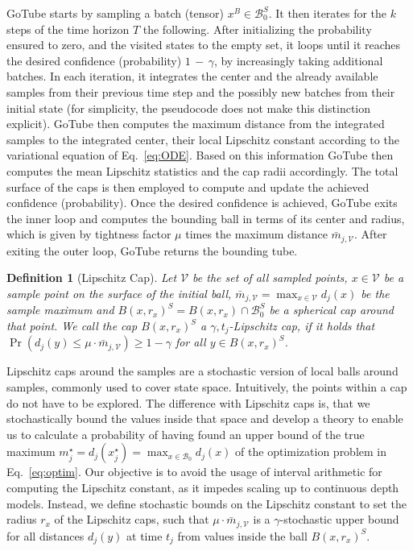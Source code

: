 \documentclass[letterpaper]{article} %
\newtheorem{definition}{Definition}
\newcommand{\calB}{\mathcal{B}}
\newcommand{\calV}{\mathcal{V}}
\begin{document}
GoTube starts by sampling a batch (tensor) $x^B\in\calB_0^S$. It then iterates for the $k$ steps of the time horizon $T$ the following. After initializing the probability ensured to zero, and the visited states to the empty set, it loops until it reaches the desired confidence (probability) $1\,{-}\,\gamma$, by increasingly taking additional batches. In each iteration, it integrates the center and the already available samples from their previous time step and the possibly new batches from their initial state (for simplicity, the pseudocode does not make this distinction explicit). GoTube then computes the maximum distance from the integrated samples to the integrated center, their local Lipschitz constant
according to the variational equation of Eq.~\eqref{eq:ODE}. Based on this information GoTube then computes the mean Lipschitz statistics and the cap radii accordingly. The total surface of the caps is then employed to compute and update the achieved confidence (probability). Once the desired confidence is achieved, GoTube exits the inner loop and computes the bounding ball in terms of its center and radius, which is given by tightness factor $\mu$ times the maximum distance $\bar{m}_{j,\calV}$. After exiting the outer loop, GoTube returns the bounding tube.
%
\begin{definition}[Lipschitz Cap]
    Let $\calV$ be the set of all sampled points, $x\in\calV$ be a sample point on the surface of the initial ball, $\bar{m}_{j,\calV} = \max_{x\in\calV} d_j(x)$ be the sample maximum and $B(x,r_x)^S = B(x,r_x)\cap\calB_0^S$ be a spherical cap around that point. We call the cap $B(x,r_x)^S$ a $\gamma,t_j$-Lipschitz cap, if it holds that $\Pr\left(d_j(y) \le \mu\cdot \bar{m}_{j,\calV}\right)\ge 1-\gamma$ for all $y\in B(x,r_x)^S$.
\end{definition}
%
Lipschitz caps around the samples are a stochastic version of local balls around samples, commonly used to cover state space. Intuitively, the points within a cap do not have to be explored. The difference with Lipschitz caps is, that we stochastically bound the values inside that space and develop a theory to enable us to calculate a probability of having found an upper bound of the true maximum $m_j^\star = d_j(x_j^\star) = \max_{x\in\calB_0} d_j(x)$ of the optimization problem in Eq.~\eqref{eq:optim}.
Our objective is to avoid the usage of interval arithmetic for computing the Lipschitz constant, as it impedes scaling up to continuous depth models. Instead, we define stochastic bounds on the Lipschitz constant to set the radius $r_x$ of the Lipschitz caps, such that $\mu\cdot\bar{m}_{j,\calV}$ is a $\gamma$-stochastic upper bound for all distances $d_j(y)$ at time $t_j$ from values inside the ball $B(x, r_x)^S$.
\end{document}
